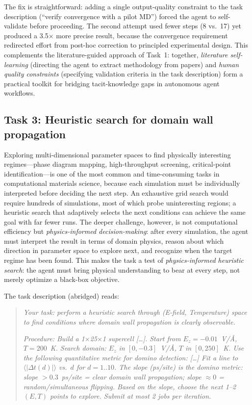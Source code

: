 \documentclass{article}
\begin{document}
The fix is straightforward: adding a single output-quality constraint to the task description (``verify convergence with a pilot MD'') forced the agent to self-validate before proceeding.
The second attempt used fewer steps (8 vs.\ 17) yet produced a 3.5$\times$ more precise result, because the convergence requirement redirected effort from post-hoc correction to principled experimental design.
This complements the literature-guided approach of Task~1: together, \emph{literature self-learning} (directing the agent to extract methodology from papers) and \emph{human quality constraints} (specifying validation criteria in the task description) form a practical toolkit for bridging tacit-knowledge gaps in autonomous agent workflows.


\subsection{Task 3: Heuristic search for domain wall propagation}
\label{sec:demo3}

Exploring multi-dimensional parameter spaces to find physically interesting regimes---phase diagram mapping, high-throughput screening, critical-point identification---is one of the most common and time-consuming tasks in computational materials science, because each simulation must be individually interpreted before deciding the next step.
An exhaustive grid search would require hundreds of simulations, most of which probe uninteresting regions; a heuristic search that adaptively selects the next conditions can achieve the same goal with far fewer runs.
The deeper challenge, however, is not computational efficiency but \emph{physics-informed decision-making}: after every simulation, the agent must interpret the result in terms of domain physics, reason about which direction in parameter space to explore next, and recognize when the target regime has been found.
This makes the task a test of \emph{physics-informed heuristic search}: the agent must bring physical understanding to bear at every step, not merely optimize a black-box objective.

The task description (abridged) reads:

\begin{quote}
\small
\textit{Your task: perform a heuristic search through (E-field, Temperature) space to find conditions where domain wall propagation is clearly observable.}

\textit{Procedure: Build a 1$\times$25$\times$1 supercell [\ldots]. Start from $E_z = -0.01$~V/\AA, $T = 200$~K. Search domain: $E_z$ in $[0, -0.3]$~V/\AA, $T$ in $[0, 250]$~K. Use the following quantitative metric for domino detection: [\ldots] Fit a line to $\langle|\Delta t(d)|\rangle$ vs.\ $d$ for $d = 1..10$. The slope (ps/site) is the domino metric: slope $> 0.3$~ps/site = clear domain wall propagation; slope $\approx 0$ = random/simultaneous flipping. Based on the slope, choose the next 1--2 $(E, T)$ points to explore. Submit at most 2 jobs per iteration.}
\end{quote}
\end{document}
